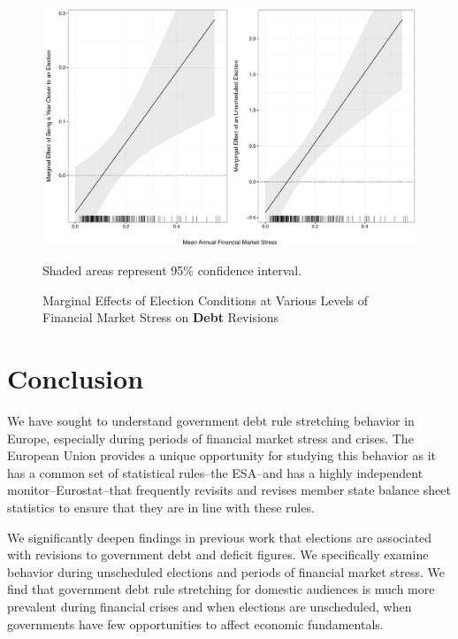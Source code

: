 \documentclass[]{article}
\begin{document}
\begin{figure}
    \caption{Marginal Effects of Election Conditions at Various Levels of Financial Market Stress on \textbf{Debt} Revisions}
    \label{me_finstress_elect}

    \begin{center}
        \includegraphics[scale=0.45]{figures/fsi_elect_me.pdf}
    \end{center}

	{\scriptsize{Shaded areas represent 95\% confidence interval.}}

\end{figure}

\begin{landscape}
    
\end{landscape}


\section{Conclusion}

We have sought to understand government debt rule stretching behavior in Europe, especially during periods of financial market stress and crises. The European Union provides a unique opportunity for studying this behavior as it has a common set of statistical rules--the ESA--and has a highly independent monitor--Eurostat--that frequently revisits and revises member state balance sheet statistics to ensure that they are in line with these rules.

We significantly deepen findings in previous work that elections are associated with revisions to government debt and deficit figures. We specifically examine behavior during unscheduled elections and periods of financial market stress. We find that government debt rule stretching for domestic audiences is much more prevalent during financial crises and when elections are unscheduled, when governments have few opportunities to affect economic fundamentals.
\end{document}
